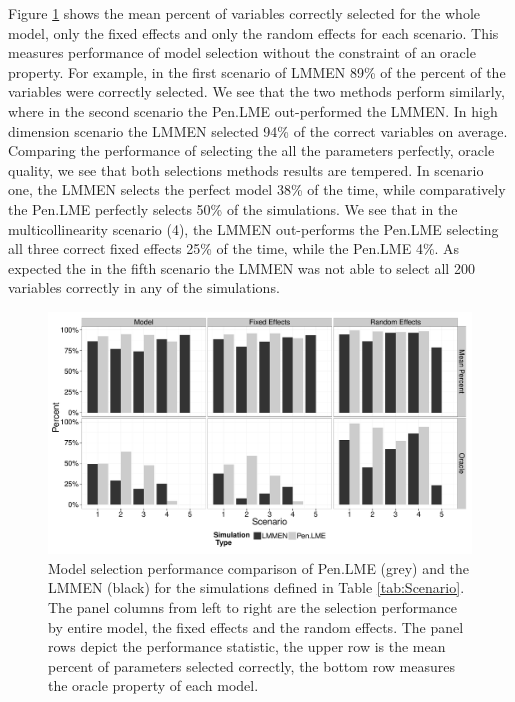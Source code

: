 \documentclass{article}
\begin{document}
Figure \ref{fig:oracle} shows the mean percent of variables correctly selected for the whole model, only the fixed effects and only the random effects for each scenario. This measures performance of model selection without the constraint of an oracle property. For example, in the first scenario of LMMEN 89\% of the percent of the variables were correctly selected. We see that the two methods perform similarly, where in the second scenario the Pen.LME out-performed the LMMEN. In high dimension scenario the LMMEN selected 94\% of the correct variables on average. Comparing the performance of selecting the all the parameters perfectly, oracle quality, we see that both selections methods results are tempered. In scenario one, the LMMEN selects the perfect model 38\% of the time, while comparatively the Pen.LME perfectly selects 50\% of the simulations. We see that in the multicollinearity scenario (4), the LMMEN out-performs the Pen.LME selecting all three correct fixed effects 25\% of the time, while the Pen.LME 4\%. As expected the in the fifth scenario the LMMEN was not able to select all 200 variables correctly in any of the simulations.
%
\begin{figure}[h]
\centering
\includegraphics{figs/lmmen_paper-oracle}
\caption{Model selection performance comparison of Pen.LME (grey) and the LMMEN (black) for the simulations defined in Table \ref{tab:Scenario}. The panel columns from left to right are the selection performance by entire model, the fixed effects and the random effects. The panel rows depict the performance statistic, the upper row is the mean percent of parameters selected correctly, the bottom row measures the oracle property of each model.}
\label{fig:oracle}
\end{figure}
%
\end{document}
